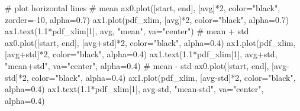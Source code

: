 \documentclass[
  letterpaper,
  DIV=11,
  numbers=noendperiod,
  oneside]{scrreprt}
\newenvironment{Shaded}{\begin{snugshade}}{\end{snugshade}}
\newcommand{\CommentTok}[1]{\textcolor[rgb]{0.37,0.37,0.37}{#1}}
\newcommand{\DecValTok}[1]{\textcolor[rgb]{0.68,0.00,0.00}{#1}}
\newcommand{\FloatTok}[1]{\textcolor[rgb]{0.68,0.00,0.00}{#1}}
\newcommand{\NormalTok}[1]{\textcolor[rgb]{0.00,0.23,0.31}{#1}}
\newcommand{\OperatorTok}[1]{\textcolor[rgb]{0.37,0.37,0.37}{#1}}
\newcommand{\StringTok}[1]{\textcolor[rgb]{0.13,0.47,0.30}{#1}}
\begin{document}
\begin{Shaded}
\begin{Highlighting}[]
\CommentTok{\# plot horizontal lines}
\CommentTok{\# mean}
\NormalTok{ax0.plot([start, end], [avg]}\OperatorTok{*}\DecValTok{2}\NormalTok{, color}\OperatorTok{=}\StringTok{"black"}\NormalTok{, zorder}\OperatorTok{={-}}\DecValTok{10}\NormalTok{, alpha}\OperatorTok{=}\FloatTok{0.7}\NormalTok{)}
\NormalTok{ax1.plot(pdf\_xlim, [avg]}\OperatorTok{*}\DecValTok{2}\NormalTok{, color}\OperatorTok{=}\StringTok{"black"}\NormalTok{, alpha}\OperatorTok{=}\FloatTok{0.7}\NormalTok{)}
\NormalTok{ax1.text(}\FloatTok{1.1}\OperatorTok{*}\NormalTok{pdf\_xlim[}\DecValTok{1}\NormalTok{], avg, }\StringTok{"mean"}\NormalTok{, va}\OperatorTok{=}\StringTok{"center"}\NormalTok{)}
\CommentTok{\# mean + std}
\NormalTok{ax0.plot([start, end], [avg}\OperatorTok{+}\NormalTok{std]}\OperatorTok{*}\DecValTok{2}\NormalTok{, color}\OperatorTok{=}\StringTok{"black"}\NormalTok{, alpha}\OperatorTok{=}\FloatTok{0.4}\NormalTok{)}
\NormalTok{ax1.plot(pdf\_xlim, [avg}\OperatorTok{+}\NormalTok{std]}\OperatorTok{*}\DecValTok{2}\NormalTok{, color}\OperatorTok{=}\StringTok{"black"}\NormalTok{, alpha}\OperatorTok{=}\FloatTok{0.4}\NormalTok{)}
\NormalTok{ax1.text(}\FloatTok{1.1}\OperatorTok{*}\NormalTok{pdf\_xlim[}\DecValTok{1}\NormalTok{], avg}\OperatorTok{+}\NormalTok{std, }\StringTok{"mean+std"}\NormalTok{, va}\OperatorTok{=}\StringTok{"center"}\NormalTok{, alpha}\OperatorTok{=}\FloatTok{0.4}\NormalTok{)}
\CommentTok{\# mean {-} std}
\NormalTok{ax0.plot([start, end], [avg}\OperatorTok{{-}}\NormalTok{std]}\OperatorTok{*}\DecValTok{2}\NormalTok{, color}\OperatorTok{=}\StringTok{"black"}\NormalTok{, alpha}\OperatorTok{=}\FloatTok{0.4}\NormalTok{)}
\NormalTok{ax1.plot(pdf\_xlim, [avg}\OperatorTok{{-}}\NormalTok{std]}\OperatorTok{*}\DecValTok{2}\NormalTok{, color}\OperatorTok{=}\StringTok{"black"}\NormalTok{, alpha}\OperatorTok{=}\FloatTok{0.4}\NormalTok{)}
\NormalTok{ax1.text(}\FloatTok{1.1}\OperatorTok{*}\NormalTok{pdf\_xlim[}\DecValTok{1}\NormalTok{], avg}\OperatorTok{{-}}\NormalTok{std, }\StringTok{"mean{-}std"}\NormalTok{, va}\OperatorTok{=}\StringTok{"center"}\NormalTok{, alpha}\OperatorTok{=}\FloatTok{0.4}\NormalTok{)}


\end{Highlighting}
\end{Shaded}
\end{document}
